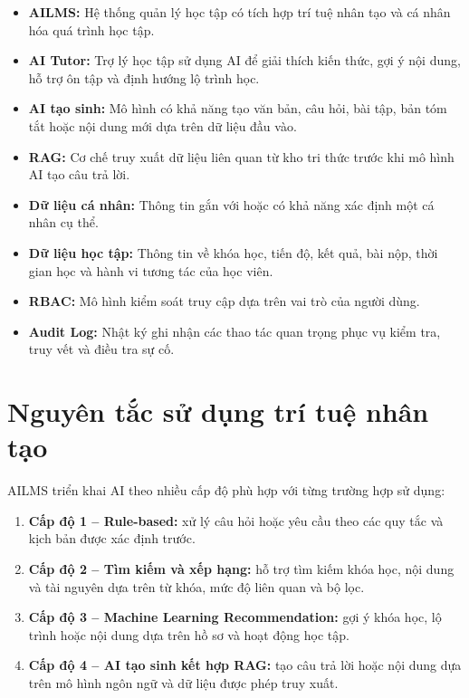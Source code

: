 \documentclass[12pt,a4paper]{article}
\begin{document}
\begin{itemize}
    \item \textbf{AILMS:} Hệ thống quản lý học tập có tích hợp trí tuệ nhân tạo và
    cá nhân hóa quá trình học tập.

    \item \textbf{AI Tutor:} Trợ lý học tập sử dụng AI để giải thích kiến thức,
    gợi ý nội dung, hỗ trợ ôn tập và định hướng lộ trình học.

    \item \textbf{AI tạo sinh:} Mô hình có khả năng tạo văn bản, câu hỏi, bài tập,
    bản tóm tắt hoặc nội dung mới dựa trên dữ liệu đầu vào.

    \item \textbf{RAG:} Cơ chế truy xuất dữ liệu liên quan từ kho tri thức trước khi
    mô hình AI tạo câu trả lời.

    \item \textbf{Dữ liệu cá nhân:} Thông tin gắn với hoặc có khả năng xác định một
    cá nhân cụ thể.

    \item \textbf{Dữ liệu học tập:} Thông tin về khóa học, tiến độ, kết quả,
    bài nộp, thời gian học và hành vi tương tác của học viên.

    \item \textbf{RBAC:} Mô hình kiểm soát truy cập dựa trên vai trò của người dùng.

    \item \textbf{Audit Log:} Nhật ký ghi nhận các thao tác quan trọng phục vụ
    kiểm tra, truy vết và điều tra sự cố.
\end{itemize}

\section{Nguyên tắc sử dụng trí tuệ nhân tạo}

AILMS triển khai AI theo nhiều cấp độ phù hợp với từng trường hợp sử dụng:

\begin{enumerate}
    \item \textbf{Cấp độ 1 -- Rule-based:}
    xử lý câu hỏi hoặc yêu cầu theo các quy tắc và kịch bản được xác định trước.

    \item \textbf{Cấp độ 2 -- Tìm kiếm và xếp hạng:}
    hỗ trợ tìm kiếm khóa học, nội dung và tài nguyên dựa trên từ khóa,
    mức độ liên quan và bộ lọc.

    \item \textbf{Cấp độ 3 -- Machine Learning Recommendation:}
    gợi ý khóa học, lộ trình hoặc nội dung dựa trên hồ sơ và hoạt động học tập.

    \item \textbf{Cấp độ 4 -- AI tạo sinh kết hợp RAG:}
    tạo câu trả lời hoặc nội dung dựa trên mô hình ngôn ngữ và dữ liệu được phép truy xuất.
\end{enumerate}
\end{document}
